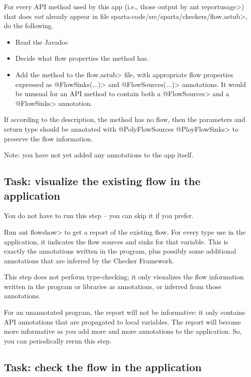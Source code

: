 For every API method used by this app (i.e., those output by \<ant
reportusage>) that does \emph{not} already appear in file
\<sparta-code/src/sparta/checkers/flow.astub>, do the following.
\begin{itemize}
\item
Read the Javadoc
\item
Decide what flow properties the method has.
\item
Add the method to the \<flow.astub> file, with
appropriate flow properties expressed as \<@FlowSinks(...)> and
\<@FlowSources(...)> annotations.
It would be unusual for an API method to contain both a \<@FlowSources>
and a \<@FlowSinks> annotation.
\end{itemize}

If according to the description, the method has no flow, then the parameters and return type
 should be annotated with \<@PolyFlowSources @PloyFlowSinks>
  to preserve the flow information.


Note: you have not yet added any annotations to the app itself.


\subsection{Task: visualize the existing flow in the application}

You do not have to run this step -- you can skip it if you
prefer.

Run \<ant flowshow> to get a report of the
existing flow.
For every type use in the application, it indicates the flow sources
and sinks for that variable. This is exactly the annotations written
in the program, plus possibly some additional annotations that are
inferred by the Checker Framework.


This step does not perform type-checking; it only visualizes the flow
information written in the program or libraries as annotations, or
inferred from those annotations.


For an unannotated program, the report will not be informative: it
only contains API annotations that are propagated to local
variables. The report will become more informative as you add more and
more annotations to the application. So, you can periodically rerun
this step. 


\subsection{Task: check the flow in the application}

